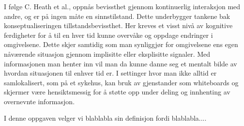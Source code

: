 \noindent
I følge C. Heath et al., oppnås bevissthet gjennom kontinuerlig interaksjon med andre, og er på ingen måte en sinnstilstand. Dette underbygger tankene bak konseptualiseringen tillstandsbevissthet. Her kreves et visst nivå av kognitive ferdigheter for å til en hver tid kunne overvåke og oppdage endringer i omgivelsene. Dette skjer samtidig som man synliggjør for omgivelsene ens egen nåværende situasjon gjennom implisitte eller eksplisitte signaler. Med informasjonen man henter inn vil man da kunne danne seg et mentalt bilde av hvordan situasjonen til enhver tid er. I settinger hvor man ikke alltid er samlokalisert, som på et sykehus, kan bruk av gjenstander som whiteboards og skjermer være hensiktsmessig for å støtte opp under deling og innhenting av overnevnte informasjon\cite{Bardram04}. 

\noindent
I denne oppgaven velger vi blablabla sin definisjon fordi blablabla....
